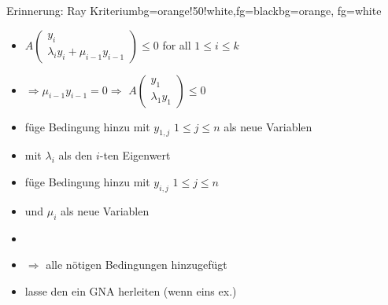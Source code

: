 \begin{frame}
	\begin{variableblock}{Erinnerung: Ray Kriterium}{bg=orange!50!white,fg=black}{bg=orange, fg=white}
		\begin{itemize}
			\setlength{\itemindent}{1cm}
			\item[(ray)] $A\begin{pmatrix} y_i \\ \lambda_i y_i + \mu_{i-1} y_{i-1} \end{pmatrix} \le 0$ for all $1 \le i \le k$
		\end{itemize}
	\end{variableblock}
	\begin{itemize}
		\setlength{\itemindent}{1cm}
		\item[$i=1$:] $\Rightarrow \mu_{i-1}y_{i-1}=0 \Rightarrow $ $A\begin{pmatrix} y_1 \\ \lambda_1 y_1 \end{pmatrix} \le 0$
		\item[]	f\"uge Bedingung hinzu mit $y_{1,j}$ $1\le j \le n$ als neue Variablen
		\item[$i>1$:] mit $\lambda_i$ als den $i$-ten Eigenwert
		\item[] f\"uge Bedingung hinzu mit $y_{i,j}$ $1 \le j \le n$ 
		\item[] und $\mu_i$ als neue Variablen
		\item[]
		\item[] $\Rightarrow$ alle n\"otigen Bedingungen  hinzugef\"ugt\checkmark
		\item[] lasse den \solver ein GNA herleiten (wenn eins ex.)
	\end{itemize}	
\end{frame}



